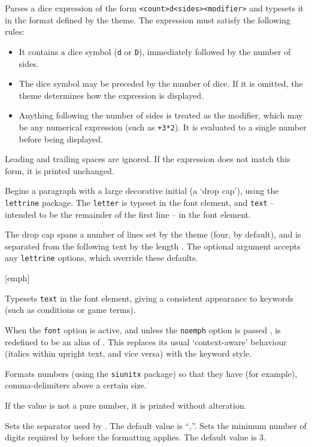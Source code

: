 		{
			Parses a dice expression of the form \texttt{<count>d<sides><modifier>} and typesets it in the format defined by the theme. The expression must satisfy the following rules:
			\begin{itemize}
				\item It contains a dice symbol (\texttt{d} or \texttt{D}), immediately followed by the number of sides.
				\item The dice symbol may be preceded by the number of dice. If it is omitted, the theme determines how the expression is displayed.
				\item Anything following the number of sides is treated as the modifier, which may be any numerical expression (such as \texttt{+3*2}). It is evaluated to a single number before being displayed.
			\end{itemize}
			Leading and trailing spaces are ignored. If the expression does not match this form, it is printed unchanged.

		}
		{
			Begins a paragraph with a large decorative initial (a `drop cap'), using the \texttt{lettrine} package. The \texttt{letter} is typeset in the  font element, and \texttt{text} -- intended to be the remainder of the first line -- in the  font element.

			The drop cap spans a number of lines set by the theme (four, by default), and is separated from the following text by the length . The optional argument accepts any \texttt{lettrine} options, which override these defaults.


		}
		{}
		{
			Typesets \texttt{text} in the  font element, giving a consistent appearance to keywords (such as conditions or game terms).

			When the \texttt{font} option is active, and unless the \texttt{noemph} option is passed ,  is redefined to be an alias of . This replaces its usual `context-aware' behaviour (italics within upright text, and vice versa) with the keyword style.

		}

		{
			Formats numbers (using the \texttt{siunitx} package) so that they have (for example), comma-delimiters above a certain size.

			If the value is not a pure number, it is printed without alteration.

		}
		{
		Sets the separator used by . The default value is ``{,}''.
		}
		{
			Sets the minimum number of digits required by  before the formatting applies. The default value is 3.
		}



